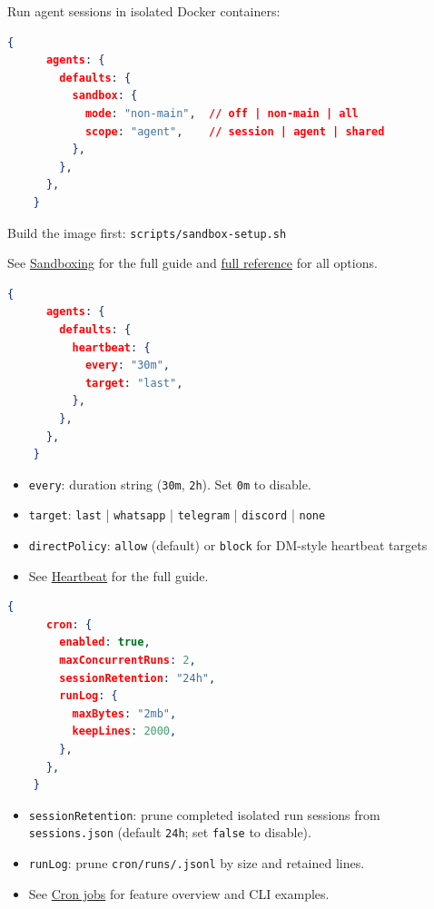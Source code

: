 Run agent sessions in isolated Docker containers:

\begin{lstlisting}[language=json]
    {
      agents: {
        defaults: {
          sandbox: {
            mode: "non-main",  // off | non-main | all
            scope: "agent",    // session | agent | shared
          },
        },
      },
    }
\end{lstlisting}


Build the image first: \texttt{scripts/sandbox-setup.sh}

See \href{/gateway/sandboxing}{Sandboxing} for the full guide and \href{/gateway/configuration-reference\#sandbox}{full reference} for all options.


\begin{lstlisting}[language=json]
    {
      agents: {
        defaults: {
          heartbeat: {
            every: "30m",
            target: "last",
          },
        },
      },
    }
\end{lstlisting}


\begin{itemize}
  \item \texttt{every}: duration string (\texttt{30m}, \texttt{2h}). Set \texttt{0m} to disable.
  \item \texttt{target}: \texttt{last} | \texttt{whatsapp} | \texttt{telegram} | \texttt{discord} | \texttt{none}
  \item \texttt{directPolicy}: \texttt{allow} (default) or \texttt{block} for DM-style heartbeat targets
  \item See \href{/gateway/heartbeat}{Heartbeat} for the full guide.
\end{itemize}



\begin{lstlisting}[language=json]
    {
      cron: {
        enabled: true,
        maxConcurrentRuns: 2,
        sessionRetention: "24h",
        runLog: {
          maxBytes: "2mb",
          keepLines: 2000,
        },
      },
    }
\end{lstlisting}


\begin{itemize}
  \item \texttt{sessionRetention}: prune completed isolated run sessions from \texttt{sessions.json} (default \texttt{24h}; set \texttt{false} to disable).
  \item \texttt{runLog}: prune \texttt{cron/runs/.jsonl} by size and retained lines.
  \item See \href{/automation/cron-jobs}{Cron jobs} for feature overview and CLI examples.
\end{itemize}



